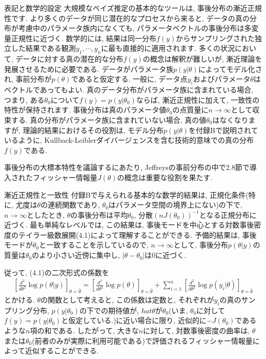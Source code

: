 \documentclass[10pt,dvipdfmx,a4]{beamer}
\newcommand{\eqn}[1]{\begin{align*}#1\end{align*}}
\begin{document}
\begin{frame}{表記と数学的設定}
大規模なベイズ推定の基本的なツールは, 事後分布の漸近正規性です.
より多くのデータが同じ潜在的なプロセスから来ると, データの真の分布が考慮中のパラメータ族内になくても, パラメータベクトルの事後分布は多変量正規性に近づく.
数学的には, 結果は同一分布$f(y)$からサンプリングされた独立した結果である観測$y_1,\cdots,y_n$に最も直接的に適用されます.
多くの状況において, データに対する真の潜在的な分布$f(y)$の概念は解釈が難しいが, 漸近理論を発展させるために必要である.
データがパラメータ族$p(y|\theta)$によってモデル化され, 事前分布が$p(\theta)$であると仮定する.
一般に, データ点$y_i$およびパラメータ$\theta$はベクトルであってもよい.
真のデータ分布がパラメータ族に含まれている場合, つまり, ある$\theta_0$について$f(y)=p(y|\theta_0)$ならば, 漸近正規性に加えて, 一致性の特性が保持されます.
事後分布は真のパラメータ値$\theta_0$の点質量に$n\rightarrow \infty$として収束する.
真の分布がパラメータ族に含まれていない場合, 真の値$\theta_0$はなくなりますが, 理論的結果におけるその役割は, モデル分布$p(y|\theta)$を付録Bで説明されているように, Kullback-Leiblerダイバージェンスを含む技術的意味での真の分布$f(y)$である.

事後分布の大標本特性を議論するにあたり, Jeffreysの事前分布の中で2.8節で導入されたフィッシャー情報量$J(\theta)$の概念は重要な役割を果たす.
\end{frame}


\begin{frame}{漸近正規性と一致性}
付録Bで与えられる基本的な数学的結果は, 正規化条件(特に, 尤度は$\theta$の連続関数であり, $\theta_0$はパラメータ空間の境界上にない)の下で, $n\rightarrow\infty$としたとき, $\theta$の事後分布は平均$\theta_0$, 分散$(nJ(\theta_0))^{-1}$となる正規分布に近づく.
最も単純なレベルでは, この結果は, 事後モードを中心とする対数事後密度のテイラー級数展開(4.1)によって理解することができる.
予備的結果は, 事後モードが$\theta_0$と一致することを示しているので, $n\rightarrow \infty$として, 事後分布$p(\theta|y)$の質量は$\theta_0$のより小さい近傍に集中し, $|\theta-\theta_0|$は0に近づく.

従って, (4.1)の二次形式の係数を
\eqn{\left[\frac{d^2}{d\theta^2}\log p(\theta|y)\right]_{\theta=\hat{\theta}}=
\left[\frac{d^2}{d\theta^2}\log p(\theta)\right]_{\theta=\hat{\theta}}+
\sum_{i=1}^n\left[\frac{d^2}{d\theta^2}\log p(y_i|\theta)\right]_{\theta=\hat{\theta}}}
とかける.
$\theta$の関数として考えると, この係数は定数と, それぞれが$y_i$の真のサンプリング分布, $p(y|\theta_0)$の下での期待値が, $hat{\theta}$が$\theta_0$(いま, $\theta_0$に対して$f(y)=p(y|\theta_0)$と仮定している.)に近い場合に限り, 近似的に$-J(\theta_0)$であるような$n$項の和である.
したがって, 大きな$n$に対して, 対数事後密度の曲率は, $\theta$または$\theta_0$(前者のみが実際に利用可能である)で評価されるフィッシャー情報量によって近似することができる.
\end{frame}
\end{document}
